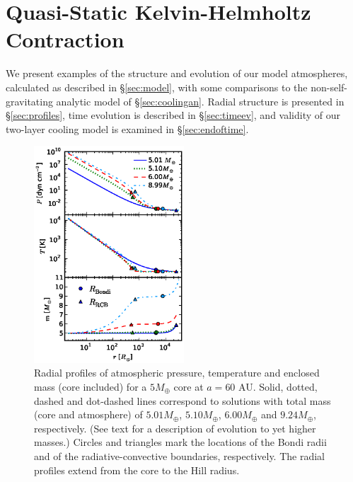 \documentclass[apj, numberedappendix]{emulateapj}
\newcommand{\MC}{M_{\rm crit}}
\begin{document}



\section{Quasi-Static Kelvin-Helmholtz Contraction}
\label{sec:KH}

We present examples of the structure and evolution of our model atmospheres, calculated as described in \S\ref{sec:model}, with some comparisons to the non-self-gravitating analytic model of \S\ref{sec:coolingan}.  Radial structure is presented in \S\ref{sec:profiles}, time evolution is described in \S\ref{sec:timeev}, and validity of our two-layer cooling model is examined in \S\ref{sec:endoftime}.

\begin{figure}[tb]
\centering
\includegraphics[width=0.5\textwidth]{../../figs/ModelAtmospheres/RadSelfGravPoly/PaperFigs/PTm_profiles_v2_smallM.eps}
\caption{Radial profiles of atmospheric pressure, temperature and enclosed mass (core included) for a $5 M_{\oplus}$ core at $a=60$ AU.   Solid, dotted, dashed and dot-dashed lines correspond to solutions with total mass (core and atmosphere) of $5.01 M_{\oplus}$, $5.10 M_{\oplus}$, $6.00 M_{\oplus}$ and $9.24 M_{\oplus}$, respectively.  (See text for a description of evolution to yet higher masses.)   Circles and triangles mark the locations of the Bondi radii and of the radiative-convective boundaries, respectively.  The radial profiles extend from the core to the Hill radius.} 
\label{fig:profiles}
\end{figure}
\end{document}
